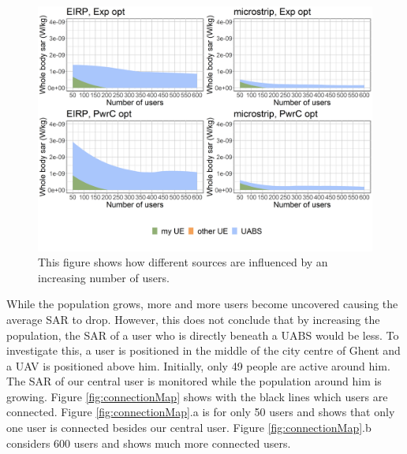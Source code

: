 \begin{figure}[h!]
\centering
  \includegraphics[width=\textwidth/6*5]{../results/s2/uFourSources.png}
  \caption{This figure shows how different sources are influenced by an increasing number of users. }
  \label{fig:s2fourSourcesMatrix}
\end{figure}

While the population grows, more and more users become uncovered causing the average SAR to drop. 
However, this does not conclude that  by increasing the population, the SAR of a user who is directly beneath a \gls{UABS} would be less.
To investigate this, a user is positioned in the middle of the city centre of Ghent and a \gls{UAV} is positioned above him. Initially, only 
49 people are active around him. The \gls{SAR} of our central user is monitored while the population around him is growing.
Figure \ref{fig:connectionMap} shows with the black lines which users are connected. Figure \ref{fig:connectionMap}.a is for only 50 users and 
shows that only one user is connected besides our central user. Figure \ref{fig:connectionMap}.b considers 600 users and shows much more connected users.

